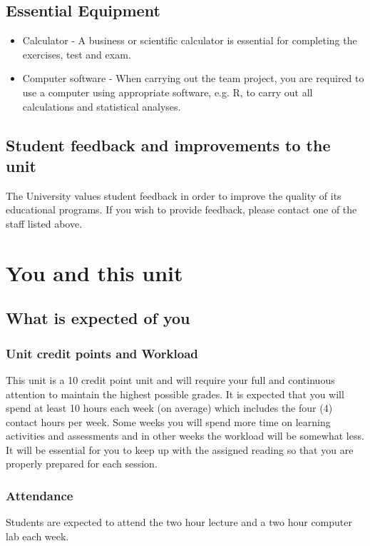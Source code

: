 \documentclass[a4paper,oneside]{book}
\begin{document}
\section{Essential Equipment}

\begin{itemize}
\item Calculator - A business or scientific calculator is essential
  for completing the exercises, test and exam.
\item Computer software - When carrying out the team project, you are
  required to use a computer using appropriate software, e.g. R, to
  carry out all calculations and statistical analyses.
\end{itemize}
  
\section{Student feedback and improvements to the unit}

The University values student feedback in order to improve the quality
of its educational programs. If you wish to provide feedback, please
contact one of the staff listed above.


\chapter{You and this unit}

\section{What is expected of you}


\subsection*{Unit credit points and Workload}
This unit is a 10 credit point unit and will require your full and
continuous attention to maintain the highest possible grades.  It is
expected that you will spend at least 10 hours each week (on average)
which includes the four (4) contact hours per week.  Some weeks you
will spend more time on learning activities and assessments and in
other weeks the workload will be somewhat less.  It will be essential
for you to keep up with the assigned reading so that you are properly
prepared for each session.

\subsection*{Attendance}
Students are expected to attend the two hour lecture and a two
hour computer lab each week.
\end{document}
